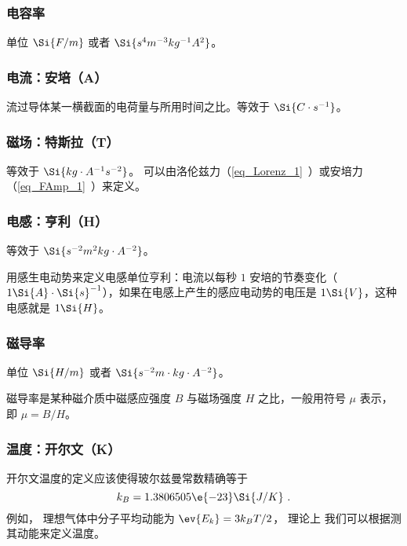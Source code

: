\subsubsection{电容率}
单位 $\Si{F/m}$ 或者 $\Si{s^4 m^{-3} kg^{-1} A^2}$。

\subsubsection{电流：安培（A）}
流过导体某一横截面的电荷量与所用时间之比。等效于 $\Si{C \cdot s^{-1}}$。

\subsubsection{磁场：特斯拉（T）}
等效于 $\Si{kg\cdot A^{-1}s^{-2}}$。 可以由洛伦兹力（\autoref{eq_Lorenz_1}~）或安培力（\autoref{eq_FAmp_1}~）来定义。

\subsubsection{电感：亨利（H）}
等效于 $\Si{ s^{-2}m^2 kg \cdot A^{-2}}$。

用感生电动势来定义电感单位亨利：电流以每秒 $1$ 安培的节奏变化（$1 \Si{A} \cdot \Si{s}^{-1}$），如果在电感上产生的感应电动势的电压是 $1 \Si{V}$，这种电感就是 $1 \Si{H}$。

\subsubsection{磁导率}
单位 $\Si{H/m}$ 或者 $\Si{s^{-2} m \cdot kg \cdot A^{-2}}$。

磁导率是某种磁介质中磁感应强度 $B$ 与磁场强度 $H$ 之比，一般用符号 $\mu$ 表示，即 $\mu=B/H$。

\subsubsection{温度：开尔文（K）}
开尔文温度的定义应该使得玻尔兹曼常数精确等于
\begin{equation}
k_B = 1.3806505\e{-23} \Si{J/K}~.
\end{equation}
例如， 理想气体中分子平均动能为 $\ev{E_k} = 3 k_B T/2$， 理论上 我们可以根据测其动能来定义温度。
